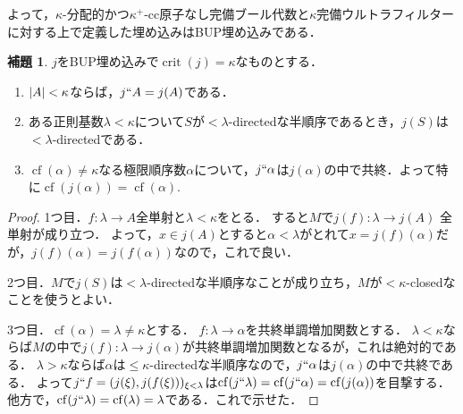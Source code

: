 \documentclass[uplatex,dvipdfmx]{jsarticle}
\newcommand{\cf}{\operatorname{cf}}
\newcommand{\crit}{\operatorname{crit}}
\DeclarePairedDelimiter\abs{\lvert}{\rvert}
\theoremstyle{definition}
\newtheorem{lem}[thm]{補題}
\begin{document}
	よって，$\kappa$-分配的かつ$\kappa^+$-cc原子なし完備ブール代数と$\kappa$完備ウルトラフィルターに対する上で定義した埋め込みはBUP埋め込みである．

	\begin{lem}
		$j$をBUP埋め込みで$\crit(j) = \kappa$なものとする．
		\begin{enumerate}
			\item $\abs{A} < \kappa$ならば，$j``A = j(A)$である．
			\item ある正則基数$\lambda < \kappa$について$S$が${<}\lambda$-directedな半順序であるとき，$j(S)$は${<}\lambda$-directedである．
			\item $\cf(\alpha) \ne \kappa$なる極限順序数$\alpha$について，$j``\alpha$は$j(\alpha)$の中で共終．よって特に$\cf(j(\alpha)) = \cf(\alpha)$.
		\end{enumerate}
	\end{lem}
	\begin{proof}
		1つ目．$f \colon \lambda \to A$全単射と$\lambda < \kappa$をとる．
		すると$M$で$j(f) \colon \lambda \to j(A)$ 全単射が成り立つ．
		よって，$x \in j(A)$とすると$\alpha < \lambda$がとれて$x = j(f)(\alpha)$だが，$j(f)(\alpha) = j(f(\alpha))$なので，これで良い．

		2つ目．$M$で$j(S)$は${<}\lambda$-directedな半順序なことが成り立ち，$M$が${<}\kappa$-closedなことを使うとよい．

		3つ目．$\cf(\alpha) = \lambda \ne \kappa$とする．
		$f \colon \lambda \to \alpha$を共終単調増加関数とする．
		$\lambda < \kappa$ならば$M$の中で$j(f) \colon \lambda \to j(\alpha)$が共終単調増加関数となるが，これは絶対的である．
		$\lambda > \kappa$ならば$\alpha$は${\le}\kappa$-directedな半順序なので，$j``\alpha$は$j(\alpha)$の中で共終である．
		よって$j``f = (j(\xi), j(f(\xi)))_{\xi < \lambda}$は$\cf(j`` \lambda) = \cf(j `` \alpha) = \cf(j(\alpha))$を目撃する．
		他方で，$\cf(j``\lambda) = \cf(\lambda) = \lambda$である．これで示せた．
	\end{proof}

	\nocite{*}
	\printbibliography[title={参考文献}]
\end{document}
